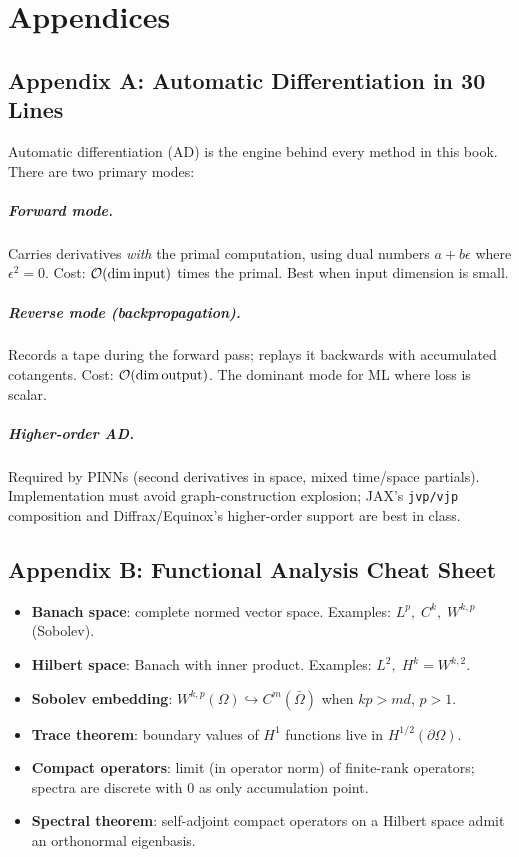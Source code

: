 \chapter{Appendices}
\label{ch:appendix}

\section*{Appendix A: Automatic Differentiation in 30 Lines}

Automatic differentiation (AD) is the engine behind every method in
this book. There are two primary modes:

\paragraph{Forward mode.}
Carries derivatives \emph{with} the primal computation, using dual
numbers $a+b\epsilon$ where $\epsilon^2=0$. Cost: $\mathcal{O}(\dim\text{input})$
times the primal. Best when input dimension is small.

\paragraph{Reverse mode (backpropagation).}
Records a tape during the forward pass; replays it backwards with
accumulated cotangents. Cost: $\mathcal{O}(\dim\text{output})$. The dominant
mode for ML where loss is scalar.

\paragraph{Higher-order AD.}
Required by PINNs (second derivatives in space, mixed time/space
partials). Implementation must avoid graph-construction explosion;
JAX's \texttt{jvp/vjp} composition and Diffrax/Equinox's higher-order
support are best in class.

\section*{Appendix B: Functional Analysis Cheat Sheet}

\begin{itemize}
\item \textbf{Banach space}: complete normed vector space. Examples:
$L^p,\;C^k,\;W^{k,p}$ (Sobolev).
\item \textbf{Hilbert space}: Banach with inner product. Examples:
$L^2,\;H^k=W^{k,2}$.
\item \textbf{Sobolev embedding}: $W^{k,p}(\Omega)\hookrightarrow C^m(\bar\Omega)$
when $kp>md$, $p>1$.
\item \textbf{Trace theorem}: boundary values of $H^1$ functions live in
$H^{1/2}(\partial\Omega)$.
\item \textbf{Compact operators}: limit (in operator norm) of finite-rank
operators; spectra are discrete with $0$ as only accumulation point.
\item \textbf{Spectral theorem}: self-adjoint compact operators on a
Hilbert space admit an orthonormal eigenbasis.
\end{itemize}

